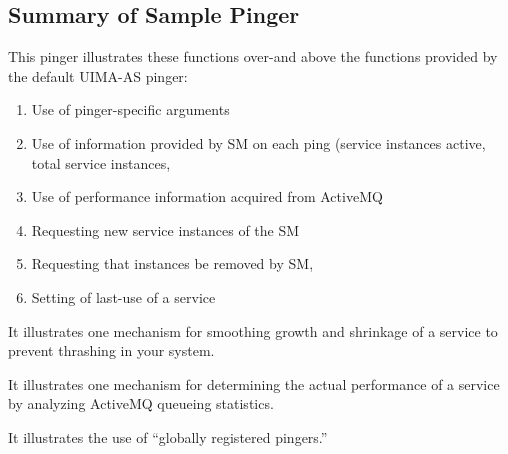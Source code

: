    \subsection{Summary of Sample Pinger}
   This pinger illustrates these functions over-and above the functions provided
   by the default UIMA-AS pinger:
   \begin{enumerate}
     \item Use of pinger-specific arguments
     \item Use of information provided by SM on each ping (service instances
       active, total service instances,
     \item Use of performance information acquired from ActiveMQ
     \item Requesting new service instances of the SM
     \item Requesting that instances be removed by SM,
     \item Setting of last-use of a service
   \end{enumerate}

   It illustrates one mechanism for smoothing growth and shrinkage of a service
   to prevent thrashing in your system.

   It illustrates one mechanism for determining the actual performance of
   a service by analyzing ActiveMQ queueing statistics.
     
   It illustrates the use of ``globally registered pingers.''
